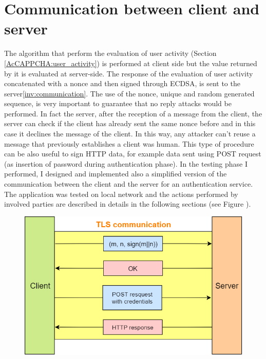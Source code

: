 \section{Communication between client and server}
The algorithm that perform the evaluation of user activity (Section \ref{AcCAPPCHA:user_activity}) is performed at client side but the value returned by it is evaluated at server-side. The response of the evaluation of user activity concatenated with a nonce and then signed through ECDSA, is sent to the server\ref{inv:communication}. The use of the nonce, unique and random generated sequence, is very important to guarantee that no reply attacks would be performed. In fact the server, after the reception of a message from the client, the server can check if the client has already sent the same nonce before and in this case it declines the message of the client. In this way, any attacker can't reuse a message that previously establishes a client was human. This type of procedure can be also useful to sign HTTP data, for example data sent using POST request (as insertion of password during authentication phase). In the testing phase I performed, I designed and implemented also a simplified version of the communication between the client and the server for an authentication service.\\
The application was tested on local network and the actions performed by involved parties are described in details in the following sections (see Figure ).
\begin{figure}
\centering
\includegraphics[width=.8\textwidth]{Images/AcCAPPCHA/client-server}
\end{figure}
